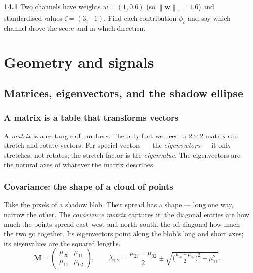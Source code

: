 \documentclass[11pt,oneside]{book}
\newcommand{\norm}[1]{\left\lVert #1\right\rVert}
\begin{document}
\begin{practice}
\textbf{14.1} Two channels have weights $w=(1,0.6)$ (so $\norm{\mathbf w}_1=1.6$) and
standardised values $\zeta=(3,-1)$. Find each contribution $\phi_k$ and say which
channel drove the score and in which direction.
\end{practice}

\part{Geometry and signals}

\chapter{Matrices, eigenvectors, and the shadow ellipse}

\section{A matrix is a table that transforms vectors}
A \emph{matrix} is a rectangle of numbers. The only fact we need: a $2\times2$ matrix
can stretch and rotate vectors. For special vectors --- the \emph{eigenvectors} --- it
only stretches, not rotates; the stretch factor is the \emph{eigenvalue}. The
eigenvectors are the natural axes of whatever the matrix describes.

\section{Covariance: the shape of a cloud of points}
Take the pixels of a shadow blob. Their spread has a shape --- long one way, narrow the
other. The \emph{covariance matrix} captures it: the diagonal entries are how much the
points spread east--west and north--south, the off-diagonal how much the two go
together. Its eigenvectors point along the blob's long and short axes; its eigenvalues
are the squared lengths.
\begin{equation}
\mathbf M=\begin{pmatrix}\mu_{20}&\mu_{11}\\ \mu_{11}&\mu_{02}\end{pmatrix},\qquad
\lambda_{1,2}=\frac{\mu_{20}+\mu_{02}}{2}\pm\sqrt{\Big(\tfrac{\mu_{20}-\mu_{02}}{2}\Big)^2+\mu_{11}^2}.
\end{equation}
\end{document}
